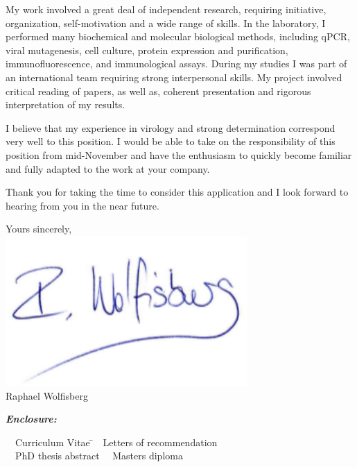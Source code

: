 \documentclass[11pt, a4paper]{article}
\begin{document}
\medskip
My work involved a great deal of independent research, requiring initiative, organization, self-motivation and a wide range of skills. In the laboratory, I performed many biochemical and molecular biological methods, including qPCR, viral mutagenesis, cell culture, protein expression and purification, immunofluorescence, and immunological assays. During my studies I was part of an international team requiring strong interpersonal skills. My project involved critical reading of papers, as well as, coherent presentation and rigorous interpretation of my results.

\medskip
I believe that my experience in virology and strong determination correspond very well to this position. I would be able to take on the responsibility of this position from mid-November and have the enthusiasm to quickly become familiar and fully adapted to the work at your company.

\bigskip
Thank you for taking the time to consider this application and I look forward to hearing from you in the near future.

\bigskip
\medskip
Yours sincerely, \\ [0.1 cm]
\includegraphics[scale=0.6, trim=0mm 3mm 0mm 0mm]{Signature} \\
Raphael Wolfisberg\\ 
\medskip

\textbf{\emph{Enclosure:}} \\

\vspace{-0.2 cm}
\begin{tabbing}

\textbullet~~Curriculum Vitae \hspace{6 cm} \= \textbullet~~Letters of recommendation \\
\textbullet~~PhD thesis abstract \> \textbullet~~Masters diploma

\end{tabbing}
\end{document}
